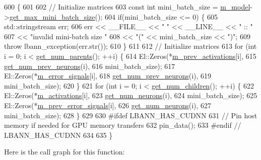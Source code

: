 \begin{DoxyCode}
600                        \{
601 
602   \textcolor{comment}{// Initialize matrices}
603   \textcolor{keyword}{const} \textcolor{keywordtype}{int} mini\_batch\_size = \hyperlink{classlbann_1_1Layer_a3d9315e99574166f2f33e37b572021d2}{m\_model}->\hyperlink{classlbann_1_1model_a8c311798ff4acaeafdfbf85162ba5084}{get\_max\_mini\_batch\_size}();
604   \textcolor{keywordflow}{if}(mini\_batch\_size <= 0) \{
605     std::stringstream err;
606     err << \_\_FILE\_\_ << \textcolor{stringliteral}{" "} << \_\_LINE\_\_ << \textcolor{stringliteral}{" :: "}
607         << \textcolor{stringliteral}{"invalid mini-batch size "}
608         << \textcolor{stringliteral}{"("} << mini\_batch\_size << \textcolor{stringliteral}{")"};
609     \textcolor{keywordflow}{throw} lbann\_exception(err.str());
610   \}
611 
612   \textcolor{comment}{// Initialize matrices}
613   \textcolor{keywordflow}{for} (\textcolor{keywordtype}{int} i = 0; i < \hyperlink{classlbann_1_1Layer_ac9290d4a6453ccda5f6b4d8b57b49ba3}{get\_num\_parents}(); ++i) \{
614     El::Zeros(*\hyperlink{classlbann_1_1Layer_a52314601c3458268f56e017dc2ade357}{m\_prev\_activations}[i],
615               \hyperlink{classlbann_1_1Layer_a27112eb70bbfbd7f3c3e749960400dec}{get\_num\_prev\_neurons}(i),
616               mini\_batch\_size);
617     El::Zeros(*\hyperlink{classlbann_1_1Layer_a452e22ac81c1a799f0614b3e942ea726}{m\_error\_signals}[i],
618               \hyperlink{classlbann_1_1Layer_a27112eb70bbfbd7f3c3e749960400dec}{get\_num\_prev\_neurons}(i),
619               mini\_batch\_size);
620   \}
621   \textcolor{keywordflow}{for} (\textcolor{keywordtype}{int} i = 0; i < \hyperlink{classlbann_1_1Layer_a1409a117c31a7ea4f2c7a4d22a3e86c3}{get\_num\_children}(); ++i) \{
622     El::Zeros(*\hyperlink{classlbann_1_1Layer_a7caf08e938141d1584e6939cefa4baed}{m\_activations}[i],
623               \hyperlink{classlbann_1_1Layer_aa4de686cc6c2dd38166f42faf874f227}{get\_num\_neurons}(i),
624               mini\_batch\_size);
625     El::Zeros(*\hyperlink{classlbann_1_1Layer_a6fdcbf884150d0b20cffe678fefd7caa}{m\_prev\_error\_signals}[i],
626               \hyperlink{classlbann_1_1Layer_aa4de686cc6c2dd38166f42faf874f227}{get\_num\_neurons}(i),
627               mini\_batch\_size);
628   \}
629 
630 \textcolor{preprocessor}{#ifdef LBANN\_HAS\_CUDNN}
631   \textcolor{comment}{// Pin host memory if needed for GPU memory transfers}
632   pin\_data();
633 \textcolor{preprocessor}{#endif // LBANN\_HAS\_CUDNN}
634 
635 \}
\end{DoxyCode}
Here is the call graph for this function\+:\nopagebreak
